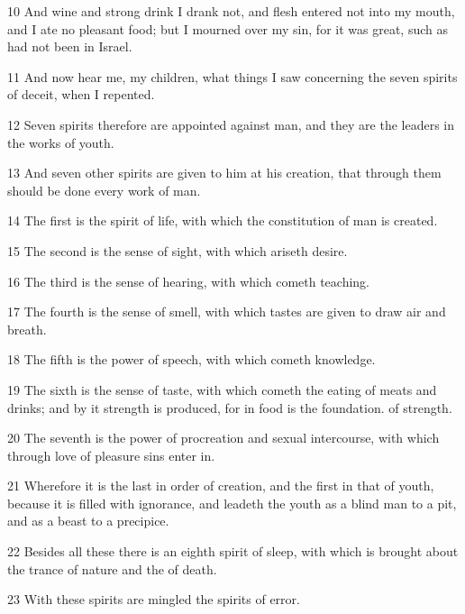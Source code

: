 \par 10 And wine and strong drink I drank not, and flesh entered not into my mouth, and I ate no pleasant food; but I mourned over my sin, for it was great, such as had not been in Israel.

\par 11 And now hear me, my children, what things I saw concerning the seven spirits of deceit, when I repented.

\par 12 Seven spirits therefore are appointed against man, and they are the leaders in the works of youth.

\par 13 And seven other spirits are given to him at his creation, that through them should be done every work of man.

\par 14 The first is the spirit of life, with which the constitution of man is created.

\par 15 The second is the sense of sight, with which ariseth desire.

\par 16 The third is the sense of hearing, with which cometh teaching.

\par 17 The fourth is the sense of smell, with which tastes are given to draw air and breath.

\par 18 The fifth is the power of speech, with which cometh knowledge.

\par 19 The sixth is the sense of taste, with which cometh the eating of meats and drinks; and by it strength is produced, for in food is the foundation. of strength.

\par 20 The seventh is the power of procreation and sexual intercourse, with which through love of pleasure sins enter in.

\par 21 Wherefore it is the last in order of creation, and the first in that of youth, because it is filled with ignorance, and leadeth the youth as a blind man to a pit, and as a beast to a precipice.

\par 22 Besides all these there is an eighth spirit of sleep, with which is brought about the trance of nature and the of death.

\par 23 With these spirits are mingled the spirits of error.

